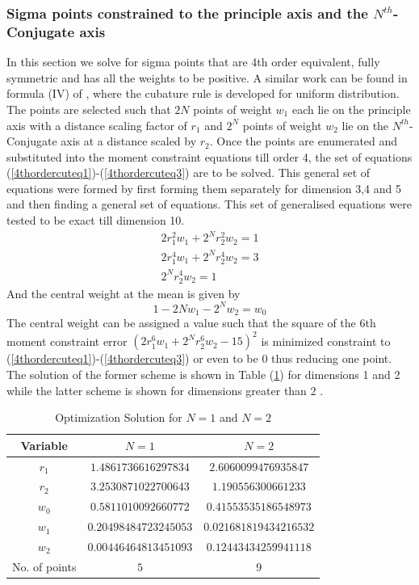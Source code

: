 \documentclass[letterpaper, 10 pt, conference]{ieeeconf}  %
\begin{document}
\subsubsection{Sigma points constrained to the principle axis and the $N^{th}$-Conjugate axis}
In this section we solve for sigma points that are 4th order equivalent, fully symmetric and has all the weights to be positive. A similar work can be found in formula (IV) of \cite{c11}, where the cubature rule is developed for uniform distribution. The points are selected such that $2N$ points of weight $w_1$ each lie on the principle axis with a distance scaling factor of $r_1$ and $2^N$ points of weight $w_2$ lie on the $N^{th}$- Conjugate axis at a distance scaled by $r_2$. Once the points are enumerated and substituted into the moment constraint equations till order 4, the set of equations (\ref{4thordercuteq1})-(\ref{4thordercuteq3}) are to be solved. This general set of equations were formed by first forming them separately for dimension 3,4 and 5 and then finding a general set of equations. This set of generalised equations were tested to be exact till dimension 10.
\setlength{\arraycolsep}{0.0em}
\begin{eqnarray}
2r_1^2w_1+2^Nr_2^2w_2=1 \label{4thordercuteq1}\\
2r_1^4w_1+2^Nr_2^4w_2=3\\
2^Nr_2^4w_2=1\label{4thordercuteq3}
\end{eqnarray}
\setlength{\arraycolsep}{5pt}
And the central weight at the mean is given by
\begin{equation}
1-2Nw_1-2^Nw_2=w_0
\end{equation}    
The central weight can be assigned a value such that the square of the 6th moment constraint error $(2r_1^6w_1+2^Nr_2^6w_2-15)^2$ is minimized constraint to (\ref{4thordercuteq1})-(\ref{4thordercuteq3}) or even to be 0 thus reducing one point. The solution of the former scheme is shown in Table (\ref{optsoln12}) for dimensions 1 and 2 while the latter scheme is shown for dimensions greater than 2 .

\begin{table}
\caption{Optimization Solution for $N=1$ and $N=2$ }
\label{optsoln12}
\begin{center}
\begin{tabular}{|c||c|c|}
\hline
Variable & $N=1$ & $N=2$\\
\hline
$r_1$ & $1.4861736616297834 $  &  $2.6060099476935847 $  \\
\hline
$r_2$ & $3.2530871022700643 $  &  $1.190556300661233 $  \\
\hline
$w_0$ & $0.5811010092660772 $  &  $0.41553535186548973 $  \\
\hline
$w_1$ & $0.20498484723245053 $  &  $0.021681819434216532 $  \\
\hline
$w_2$ & $0.00446464813451093 $  &  $0.12443434259941118 $  \\
\hline
No. of points & $5$  &  $9$  \\
\hline
\end{tabular}
\end{center}
\end{table}
\end{document}
